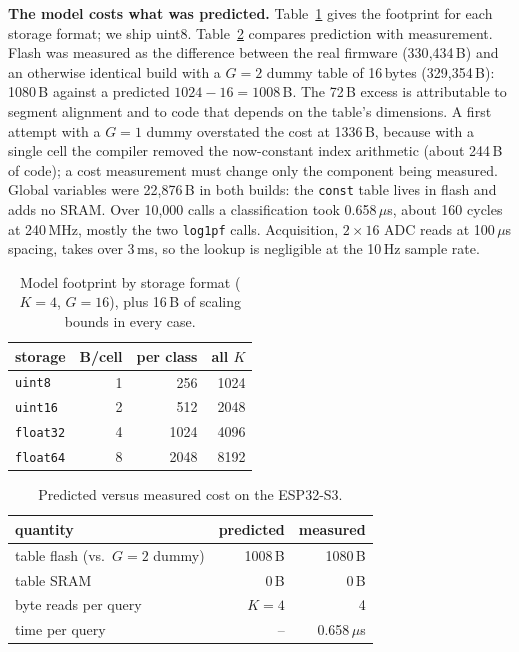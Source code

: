 \documentclass[10pt,a4paper,twocolumn]{article}
\begin{document}
\textbf{The model costs what was predicted.} Table~\ref{tab:footprint} gives the footprint
for each storage format; we ship uint8. Table~\ref{tab:cost} compares prediction with
measurement. Flash was measured as the difference between the real firmware
(330{,}434\,B) and an otherwise identical build with a $G=2$ dummy table of 16\,bytes
(329{,}354\,B): 1080\,B against a predicted $1024-16=1008$\,B. The 72\,B excess is
attributable to segment alignment and to code that depends on the table's dimensions.
A first attempt with a $G=1$ dummy overstated the cost at 1336\,B, because with a single
cell the compiler removed the now-constant index arithmetic (about 244\,B of code); a cost
measurement must change only the component being measured. Global variables were
22{,}876\,B in both builds: the \texttt{const} table lives in flash and adds no SRAM.
Over 10{,}000 calls a classification took 0.658\,$\mu$s, about 160 cycles at 240\,MHz,
mostly the two \texttt{log1pf} calls. Acquisition, $2\times16$ ADC reads at 100\,$\mu$s
spacing, takes over 3\,ms, so the lookup is negligible at the 10\,Hz sample rate.

\begin{table}[!bt]
\centering
\caption{Model footprint by storage format ($K=4$, $G=16$), plus 16\,B of scaling bounds
in every case.}
\label{tab:footprint}
\begin{tabularx}{\linewidth}{@{}X r r r@{}}
\toprule
storage & B/cell & per class & all $K$ \\
\midrule
\texttt{uint8} & 1 & 256 & 1024 \\
\texttt{uint16} & 2 & 512 & 2048 \\
\texttt{float32} & 4 & 1024 & 4096 \\
\texttt{float64} & 8 & 2048 & 8192 \\
\bottomrule
\end{tabularx}
\end{table}

\begin{table}[!bt]
\centering
\caption{Predicted versus measured cost on the ESP32-S3.}
\label{tab:cost}
\begin{tabularx}{\linewidth}{@{}X r r@{}}
\toprule
quantity & predicted & measured \\
\midrule
table flash (vs.\ $G=2$ dummy) & 1008\,B & 1080\,B \\
table SRAM & 0\,B & 0\,B \\
byte reads per query & $K=4$ & 4 \\
time per query & -- & 0.658\,$\mu$s \\
\bottomrule
\end{tabularx}
\end{table}
\end{document}
